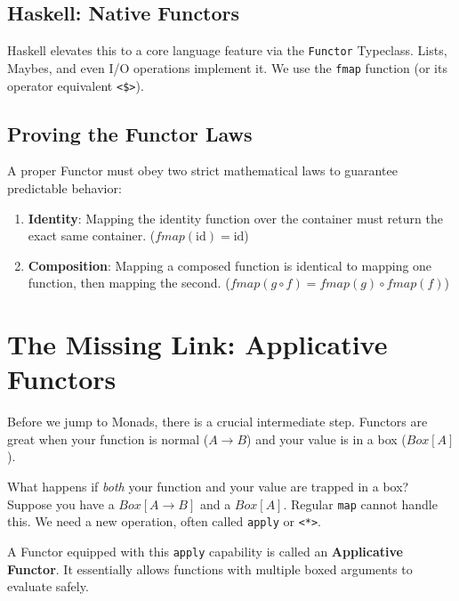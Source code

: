 \subsection{Haskell: Native Functors}
Haskell elevates this to a core language feature via the \texttt{Functor} Typeclass. Lists, Maybes, and even I/O operations implement it. We use the \texttt{fmap} function (or its operator equivalent \texttt{<\$>}).



\subsection{Proving the Functor Laws}
A proper Functor must obey two strict mathematical laws to guarantee predictable behavior:
\begin{enumerate}
    \item \textbf{Identity}: Mapping the identity function over the container must return the exact same container. ($fmap(\text{id}) = \text{id}$)
    \item \textbf{Composition}: Mapping a composed function is identical to mapping one function, then mapping the second. ($fmap(g \circ f) = fmap(g) \circ fmap(f)$)
\end{enumerate}



\section{The Missing Link: Applicative Functors}
Before we jump to Monads, there is a crucial intermediate step. Functors are great when your function is normal ($A \rightarrow B$) and your value is in a box ($Box[A]$).

What happens if \textit{both} your function and your value are trapped in a box? Suppose you have a $Box[A \rightarrow B]$ and a $Box[A]$. Regular \texttt{map} cannot handle this. We need a new operation, often called \texttt{apply} or \texttt{<*>}.

A Functor equipped with this \texttt{apply} capability is called an \textbf{Applicative Functor}. It essentially allows functions with multiple boxed arguments to evaluate safely.



